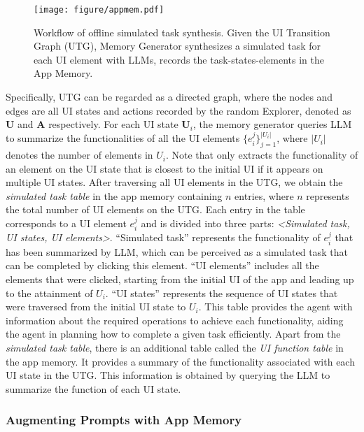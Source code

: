 \begin{figure*}
    \centering
    \texttt{[image: figure/appmem.pdf]}
    \caption{Workflow of offline simulated task synthesis. Given the UI Transition Graph (UTG), Memory Generator synthesizes a simulated task for each UI element with LLMs,  records the task-states-elements in the App Memory.}
    \label{fig:generating_functions}
    \vspace{-0.4cm}
\end{figure*}

Specifically, UTG can be regarded as a directed graph, where the nodes and edges are all UI states and actions recorded by the random Explorer, denoted as $\mathbf{U}$ and $\mathbf{A}$ respectively. 
For each UI state $\mathbf{U}_i$, the memory generator queries LLM to summarize the functionalities of all the UI elements $\{e_i^{j}\}_{j=1}^{|U_i|}$, where $|U_i|$ denotes the number of elements in $U_i$. 
Note that \name only extracts the functionality of an element on the UI state that is closest to the initial UI if it appears on multiple UI states.
After traversing all UI elements in the UTG, we obtain the \textit{simulated task table} in the app memory containing $n$ entries, where $n$ represents the total number of UI elements on the UTG. Each entry in the table corresponds to a UI element $e_i^{j}$ and is divided into three parts: \textit{<Simulated task, UI states, UI elements>}.  ``Simulated task'' represents the functionality of $e_i^{j}$ that has been summarized by LLM, which can be perceived as a simulated task that can be completed by clicking this element. ``UI elements'' includes all the elements that were clicked, starting from the initial UI of the app and leading up to the attainment of $U_i$. ``UI states'' represents the sequence of UI states that were traversed from the initial UI state to $U_i$. 
This table provides the agent with information about the required operations to achieve each functionality, aiding the agent in planning how to complete a given task efficiently.
Apart from the \textit{simulated task table}, there is an additional table called the \textit{UI function table} in the app memory. It provides a summary of the functionality associated with each UI state in the UTG. This information is obtained by querying the LLM to summarize the function of each UI state.

\subsubsection{Augmenting Prompts with App Memory}
\label{sec:prompt_augment}


